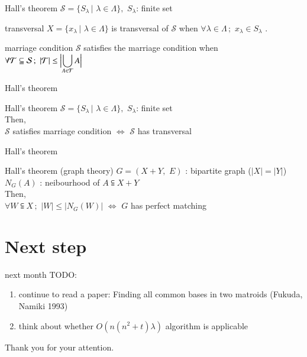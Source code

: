 \documentclass[11pt,xcolor=dvipsnames,table,dvipdfmx]{beamer}
\begin{document}
\begin{frame}{Hall's theorem}
 $\mathcal{S} = \{S_\lambda\,|\,\,\lambda \in \Lambda\},\,\,S_\lambda$: finite set \\
 \vspace{0.5cm}
 \begin{block}{transversal}
  $X = \{x_\lambda\,|\,\,\lambda \in \Lambda\}$ is \alert{transversal} of $\mathcal{S}$ when $\forall \lambda \in \Lambda \,;\,\,x_\lambda \in S_\lambda$ .
 \end{block}
 \begin{block}{marriage condition}
  $\mathcal{S}$ satisfies the \alert{marriage condition} when \\
  $\forall \mathcal{T} \subseteqq \mathcal{S}\,;\,\,|\mathcal{T}| \leq {\Bigl |}{\displaystyle \bigcup_{A\in \mathcal{T}}A}{\Bigr |}$
 \end{block}
\end{frame}


\begin{frame}{Hall's theorem}
 \begin{block}{Hall's theorem}
  $\mathcal{S} = \{S_\lambda\,|\,\,\lambda \in \Lambda\},\,\,S_\lambda$: finite set \\
  Then, \\ $\mathcal{S}$ satisfies marriage condition $\iff$ $\mathcal{S}$ has transversal
 \end{block}
\end{frame}

\begin{frame}{Hall's theorem}
 \begin{block}{Hall's theorem (graph theory)}
  $G = (X + Y,\,\,E)$ : bipartite graph ($|X| = |Y|$)\\
  $N_G (A)$ : neibourhood of $A \subseteqq X + Y$ \\
  Then, \\ $\forall W \subseteqq X\,;\,\,|W| \leq |N_G (W)|$  $\iff$ $G$ has perfect matching
 \end{block}
\end{frame}


\section{Next step}
\begin{frame}{next month}
 TODO:
 \begin{enumerate}
  \item continue to read a paper: Finding all common bases in two matroids (Fukuda, Namiki 1993)
  \item think about whether $O(n(n^2 + t)\lambda)$ algorithm is applicable
 \end{enumerate}
\end{frame}

\begin{frame}
 \begin{center}
  Thank you for your attention.
 \end{center}
\end{frame}
\end{document}
